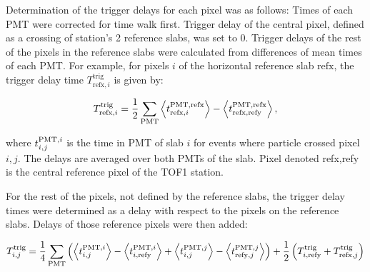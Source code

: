 Determination of the trigger delays for each pixel was as follows:
Times of each PMT were corrected for time walk first. Trigger delay of
the central pixel, defined as a crossing of station's 2 reference
slabs, was set to 0. Trigger delays of the rest of the pixels in the
reference slabs were calculated from differences of mean times of each
PMT. For example, for pixels $i$ of the horizontal reference slab
$\text{refx}$, the trigger delay time $T^\text{trig}_{\text{refx},i}$
is given by:
%
\begin{linenomath}
  \begin{equation}
    \label{eq:trigdel:a}
    T^\text{trig}_{\text{refx},i} =
    \frac12\sum_{\text{PMT}}
    \left< t^{\text{PMT}, \text{refx}}_{\text{refx},i} \right> -
    \left< t^{\text{PMT},\text{refx}}_{\text{refx},\text{refy}} \right>,
  \end{equation}
\end{linenomath}
%
where $t^{\text{PMT}, i}_{i,j}$ is the time in PMT of slab $i$ for events
where particle crossed pixel $i, j$. The delays are averaged over both
PMTs of the slab. Pixel denoted refx,refy is the central reference
pixel of the TOF1 station.

For the rest of the pixels, not defined by the reference slabs, the
trigger delay times were determined as a delay with respect to the
pixels on the reference slabs. Delays of those reference pixels were
then added:
%
\newcommand{\Ttrig}[1]{\ensuremath{T^\text{trig}_{#1}}}
%
\begin{linenomath}
  \begin{equation}
    \Ttrig{i,j} =
    \frac14\sum_{\PMT}
    \left(
      \mean{\ttrig{\PMT,i}{i,j}} - \mean{\ttrig{\PMT,i}{i,\text{refy}}} +
      \mean{\ttrig{\PMT,j}{i,j}} - \mean{\ttrig{\PMT,j}{\text{refy},j}}
    \right)
    + \frac12
    \left(
      \Ttrig{i,\text{refy}} + \Ttrig{\text{refx},j}
    \right)
    \label{eq:trigdel:both}
  \end{equation}
\end{linenomath}



